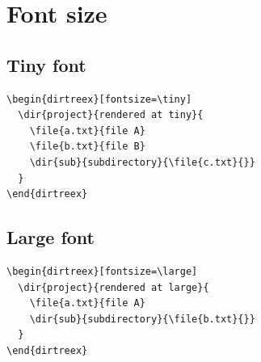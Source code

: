 \documentclass[11pt]{article}
\begin{document}
\begin{dirtreex}
\end{dirtreex}

\clearpage

\section{Font size}

\subsection{Tiny font}

\begin{Verbatim}
\begin{dirtreex}[fontsize=\tiny]
  \dir{project}{rendered at tiny}{
    \file{a.txt}{file A}
    \file{b.txt}{file B}
    \dir{sub}{subdirectory}{\file{c.txt}{}}
  }
\end{dirtreex}
\end{Verbatim}

\begin{dirtreex}[fontsize=\tiny]
\end{dirtreex}

\subsection{Large font}

\begin{Verbatim}
\begin{dirtreex}[fontsize=\large]
  \dir{project}{rendered at large}{
    \file{a.txt}{file A}
    \dir{sub}{subdirectory}{\file{b.txt}{}}
  }
\end{dirtreex}
\end{Verbatim}

\begin{dirtreex}[fontsize=\large]
\end{dirtreex}
\end{document}
